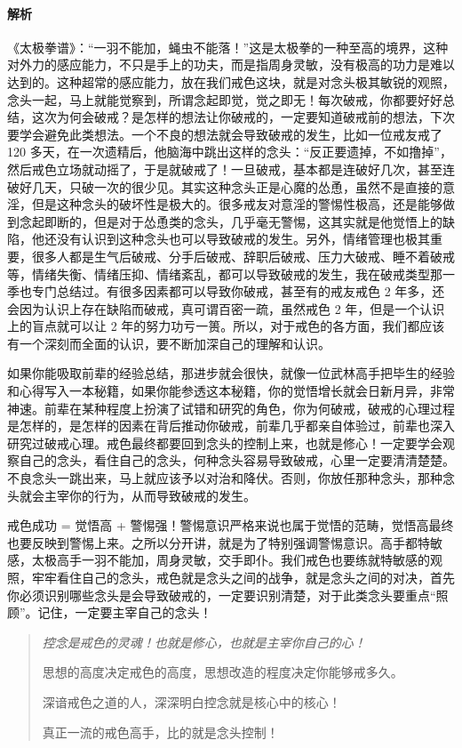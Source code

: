 \documentclass{ctexart}
\begin{document}
\paragraph{解析} 《太极拳谱》：“一羽不能加，蝇虫不能落！”这是太极拳的一种至高的境界，这种对外力的感应能力，不只是手上的功夫，而是指周身灵敏，没有极高的功力是难以达到的。这种超常的感应能力，放在我们戒色这块，就是对念头极其敏锐的观照，念头一起，马上就能觉察到，所谓念起即觉，觉之即无！每次破戒，你都要好好总结，这次为何会破戒？是怎样的想法让你破戒的，一定要知道破戒前的想法，下次要学会避免此类想法。一个不良的想法就会导致破戒的发生，比如一位戒友戒了 120 多天，在一次遗精后，他脑海中跳出这样的念头：“反正要遗掉，不如撸掉”，然后戒色立场就动摇了，于是就破戒了！一旦破戒，基本都是连破好几次，甚至连破好几天，只破一次的很少见。其实这种念头正是心魔的怂恿，虽然不是直接的意淫，但是这种念头的破坏性是极大的。很多戒友对意淫的警惕性极高，还是能够做到念起即断的，但是对于怂恿类的念头，几乎毫无警惕，这其实就是他觉悟上的缺陷，他还没有认识到这种念头也可以导致破戒的发生。另外，情绪管理也极其重要，很多人都是生气后破戒、分手后破戒、辞职后破戒、压力大破戒、睡不着破戒等，情绪失衡、情绪压抑、情绪紊乱，都可以导致破戒的发生，我在破戒类型那一季也专门总结过。有很多因素都可以导致你破戒，甚至有的戒友戒色 2 年多，还会因为认识上存在缺陷而破戒，真可谓百密一疏，虽然戒色 2 年，但是一个认识上的盲点就可以让 2 年的努力功亏一篑。所以，对于戒色的各方面，我们都应该有一个深刻而全面的认识，要不断加深自己的理解和认识。

如果你能吸取前辈的经验总结，那进步就会很快，就像一位武林高手把毕生的经验和心得写入一本秘籍，如果你能参透这本秘籍，你的觉悟增长就会日新月异，非常神速。前辈在某种程度上扮演了试错和研究的角色，你为何破戒，破戒的心理过程是怎样的，是怎样的因素在背后推动你破戒，前辈几乎都亲自体验过，前辈也深入研究过破戒心理。戒色最终都要回到念头的控制上来，也就是修心！一定要学会观察自己的念头，看住自己的念头，何种念头容易导致破戒，心里一定要清清楚楚。不良念头一跳出来，马上就应该予以对治和降伏。否则，你放任那种念头，那种念头就会主宰你的行为，从而导致破戒的发生。

戒色成功 = 觉悟高 + 警惕强！警惕意识严格来说也属于觉悟的范畴，觉悟高最终也要反映到警惕上来。之所以分开讲，就是为了特别强调警惕意识。高手都特敏感，太极高手一羽不能加，周身灵敏，交手即仆。我们戒色也要练就特敏感的观照，牢牢看住自己的念头，戒色就是念头之间的战争，就是念头之间的对决，首先你必须识别哪些念头是会导致破戒的，一定要识别清楚，对于此类念头要重点“照顾”。记住，一定要主宰自己的念头！

\begin{quotation}\it
    控念是戒色的灵魂！也就是修心，也就是主宰你自己的心！

    思想的高度决定戒色的高度，思想改造的程度决定你能够戒多久。

    深谙戒色之道的人，深深明白控念就是核心中的核心！

    真正一流的戒色高手，比的就是念头控制！
\end{quotation}
\end{document}
